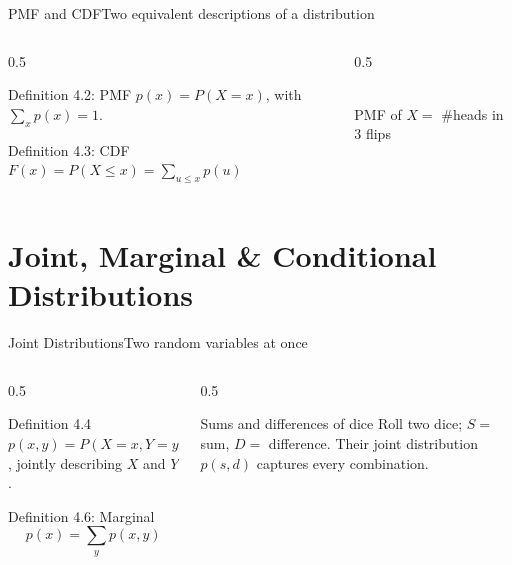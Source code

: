 \documentclass[aspectratio=169,11pt]{beamer}
\begin{document}
\begin{frame}{PMF and CDF}{Two equivalent descriptions of a distribution}
  \begin{columns}[T]
    \begin{column}{0.5\textwidth}
      \begin{block}{Definition 4.2: PMF}
        \small $p(x) = P(X=x)$, with $\sum_x p(x)=1$.
      \end{block}
      \begin{block}{Definition 4.3: CDF}
        \small $F(x) = P(X \le x) = \sum_{u \le x} p(u)$
      \end{block}
    \end{column}
    \begin{column}{0.5\textwidth}
      \centering
      \\
      \scriptsize PMF of $X=$ \#heads in 3 flips
    \end{column}
  \end{columns}
\end{frame}

\section{Joint, Marginal \& Conditional Distributions}

\begin{frame}{Joint Distributions}{Two random variables at once}
  \begin{columns}[T]
    \begin{column}{0.5\textwidth}
      \begin{block}{Definition 4.4}
        \small $p(x,y) = P(X=x, Y=y)$, jointly describing $X$ and $Y$.
      \end{block}
      \begin{block}{Definition 4.6: Marginal}
        \[ p(x) = \sum_y p(x,y) \]
      \end{block}
    \end{column}
    \begin{column}{0.5\textwidth}
      \begin{exampleblock}{Sums and differences of dice}
        \small Roll two dice; $S=$ sum, $D=$ difference. Their joint
        distribution $p(s,d)$ captures every combination.
      \end{exampleblock}
    \end{column}
  \end{columns}
\end{frame}
\end{document}
